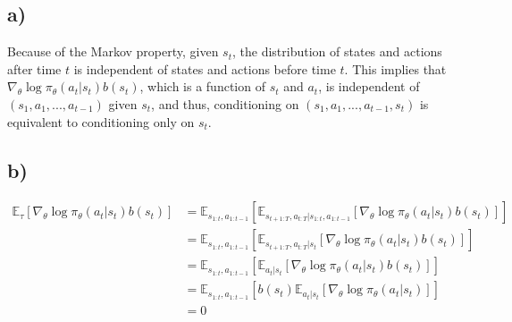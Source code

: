 \documentclass[10pt]{article}
\begin{document}
\subsection*{a)}
Because of the Markov property, given $s_t$, the distribution of states and actions after time $t$ is independent of states and actions before time $t$. This implies that $\nabla_\theta \log \pi_\theta(a_t|s_t) b(s_t)$, which is a function of $s_t$ and $a_t$, is independent of $(s_1, a_1, ..., a_{t-1})$ given $s_t$, and thus, conditioning on $(s_1, a_1, ..., a_{t-1}, s_t)$ is equivalent to conditioning only on $s_t$.

\subsection*{b)}
\begin{equation*}
\begin{aligned}
\mathbb{E}_{\tau}\left[ \nabla_\theta \log \pi_\theta(a_t|s_t) b(s_t) \right] &= \mathbb{E}_{s_{1:t}, a_{1:t-1}} \left[ \mathbb{E}_{s_{t+1:T}, a_{t:T} | s_{1:t}, a_{1:t-1}} \left[ \nabla_\theta \log \pi_\theta(a_t|s_t) b(s_t) \right] \right] \\
&= \mathbb{E}_{s_{1:t}, a_{1:t-1}} \left[ \mathbb{E}_{s_{t+1:T}, a_{t:T} | s_t} \left[ \nabla_\theta \log \pi_\theta(a_t|s_t) b(s_t) \right] \right] \\
&= \mathbb{E}_{s_{1:t}, a_{1:t-1}} \left[ \mathbb{E}_{a_t | s_t} \left[ \nabla_\theta \log \pi_\theta(a_t|s_t) b(s_t) \right] \right] \\
&= \mathbb{E}_{s_{1:t}, a_{1:t-1}} \left[ b(s_t) \mathbb{E}_{a_t | s_t} \left[ \nabla_\theta \log \pi_\theta(a_t|s_t) \right] \right] \\
&= 0
\end{aligned}
\end{equation*}
\end{document}
